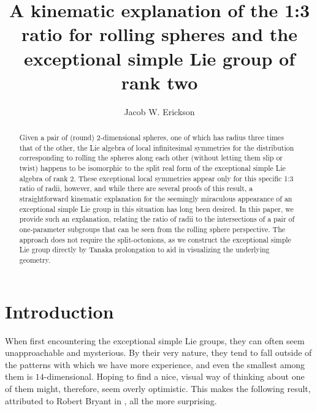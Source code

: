 \documentclass[12pt,a4paper]{amsart}
\title[A kinematic explanation of the 1:3 ratio]{A kinematic explanation of the 1:3 ratio for rolling spheres and the exceptional simple Lie group of rank two}
\author{Jacob W. Erickson}
\theoremstyle{definition}
\begin{document}
\begin{abstract}Given a pair of (round) 2-dimensional spheres, one of which has radius three times that of the other, the Lie algebra of local infinitesimal symmetries for the distribution corresponding to rolling the spheres along each other (without letting them slip or twist) happens to be isomorphic to the split real form of the exceptional simple Lie algebra of rank 2. These exceptional local symmetries appear only for this specific 1:3 ratio of radii, however, and while there are several proofs of this result, a straightforward kinematic explanation for the seemingly miraculous appearance of an exceptional simple Lie group in this situation has long been desired. In this paper, we provide such an explanation, relating the ratio of radii to the intersections of a pair of one-parameter subgroups that can be seen from the rolling sphere perspective. The approach does not require the split-octonions, as we construct the exceptional simple Lie group directly by Tanaka prolongation to aid in visualizing the underlying geometry.\end{abstract}

\maketitle

\section{Introduction}
When first encountering the exceptional simple Lie groups, they can often seem unapproachable and mysterious. By their very nature, they tend to fall outside of the patterns with which we have more experience, and even the smallest among them is $14$-dimensional. Hoping to find a nice, visual way of thinking about one of them might, therefore, seem overly optimistic. This makes the following result, attributed to Robert Bryant in \cite{BorMontgomery2009}, all the more surprising.
\end{document}
